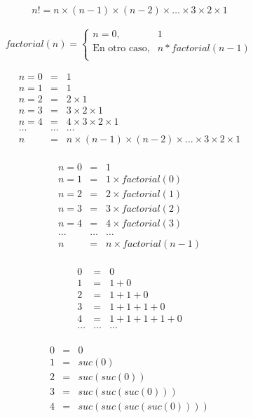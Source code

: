 \documentclass[12pt,letterpaper]{article}
\begin{document}
\begin{eqnarray*}
  n! = n \times (n - 1) \times (n - 2) \times \ldots \times 3 \times 2 \times 1
\end{eqnarray*}

\[
  factorial(n) =
  \begin{cases}
    n = 0 , & 1 \\
    \text{En otro caso}, & n * factorial(n - 1) \\
  \end{cases}
\]

\begin{eqnarray*}
  n = 0 & = & 1\\
  n = 1 & = & 1 \\
  n = 2 & = & 2 \times 1\\
  n = 3 & = & 3 \times 2 \times 1 \\
  n = 4 & = & 4 \times 3 \times 2 \times 1 \\
  \ldots & \ldots & \ldots \\
  n     & = & n \times (n - 1) \times (n - 2) \times \ldots \times 3 \times 2 \times 1 \\
\end{eqnarray*}



\begin{eqnarray*}
  n = 0 & = & 1\\
  n = 1 & = & 1 \times factorial(0) \\
  n = 2 & = & 2 \times factorial(1)\\
  n = 3 & = & 3 \times factorial(2) \\
  n = 4 & = & 4 \times factorial(3) \\
  \ldots & \ldots & \ldots \\
  n     & = & n \times factorial(n - 1) \\
\end{eqnarray*}

\begin{eqnarray*}
  0 & = & 0\\
  1 & = & 1 + 0\\
  2 & = & 1 + 1 + 0 \\
  3 & = & 1 + 1 + 1 + 0 \\
  4 & = & 1 + 1 + 1 + 1 + 0 \\
  \ldots & \ldots & \ldots \\
\end{eqnarray*}

\begin{eqnarray*}
  0 & = & 0\\
  1 & = & suc(0) \\
  2 & = & suc(suc(0)) \\
  3 & = & suc(suc(suc(0))) \\
  4 & = & suc(suc(suc(suc(0)))) \\
\end{eqnarray*}
\end{document}
